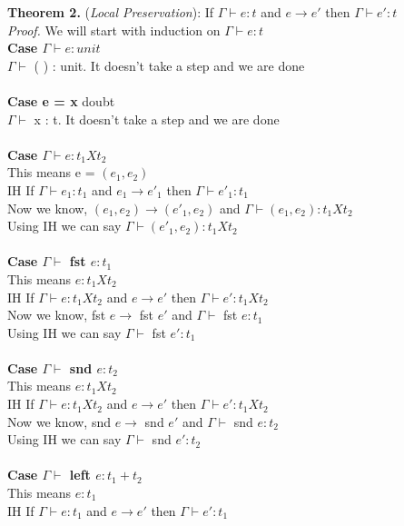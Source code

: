 \documentclass{article}
\begin{document}
\textbf{Theorem 2.} (\textit{Local Preservation}): If $\Gamma \vdash e : t$ and  $e \to e'$ then $\Gamma \vdash e' : t$
  \\
\textit{Proof.} We will start with induction on $\Gamma \vdash e : t$ \\
\textbf{Case $\Gamma \vdash e : unit$} \\
 $\Gamma \vdash $ ( ) : unit. It doesn't take a step and we are done \\ \\
\textbf{Case e = x}       \quad doubt\\ 
$\Gamma \vdash $ x : t. It doesn't take a step and we are done \\ \\
\textbf{Case $\Gamma \vdash e : t_1 X t_2$ } \\
This means e = $(e_1, e_2)$ \\
IH If $\Gamma \vdash e_1 : t_1$ and  $e_1 \to e'_1$ then $\Gamma \vdash e'_1 : t_1$ \\
Now we know, $(e_1,e_2) \to (e'_1, e_2)$ and $\Gamma \vdash (e_1, e_2) : t_1 X t_2$ \\
Using IH we can say $\Gamma \vdash (e'_1, e_2) : t_1 X t_2$ \\\\
\textbf{Case $\Gamma \vdash$ fst $e : t_1$ } \\
This means $e : t_1Xt_2$ \\
IH If $\Gamma \vdash e : t_1Xt_2$ and  $e \to e'$ then $\Gamma \vdash e' : t_1Xt_2$ \\
Now we know, fst $e \to$ fst $e'$ and $\Gamma \vdash$ fst $e : t_1$ \\
Using IH we can say $\Gamma \vdash$ fst $ e' : t_1$ \\\\
\textbf{Case $\Gamma \vdash$ snd $e : t_2$ } \\
This means $e : t_1Xt_2$ \\
IH If $\Gamma \vdash e : t_1Xt_2$ and  $e \to e'$ then $\Gamma \vdash e' : t_1Xt_2$ \\
Now we know, snd $e \to$ snd $e'$ and $\Gamma \vdash$ snd $e : t_2$ \\
Using IH we can say $\Gamma \vdash$ snd $ e' : t_2$ \\\\
\textbf{Case $\Gamma \vdash$ left $e : t_1+t_2$ } \\
This means $e : t_1$ \\
IH If $\Gamma \vdash e : t_1$ and  $e \to e'$ then $\Gamma \vdash e' : t_1$ \\
\end{document}
